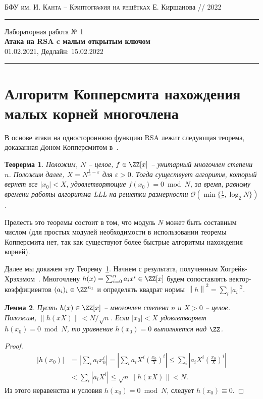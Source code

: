 \documentclass[11pt]{exam}
\newtheorem{theorem}{Теорерма}
\newtheorem{lemma}[theorem]{Лемма}
\theoremstyle{definition}
\newcommand{\bigO}{\mathcal{O}}
\newcommand*\abs[1]{\left\lvert#1\right\rvert}
\newcommand*\norm[1]{\left\lVert#1\right\rVert}
\begin{document}
	{\noindent
		\textsc{БФУ им. И. Канта -- Криптография на решётках}
		\hfill {Е. Киршанова // 2022\\}
\hrule
\begin{center}
	{\LARGE
			Лабораторная работа № 1 \\[5pt]
			\textbf{Атака на RSA c малым открытым ключом } \\[10pt]
	 	{01.02.2021, Дедлайн: 15.02.2022} 
 	} 
\end{center}
\hrule \vspace{5mm}
	
	\thispagestyle{empty}
	
	\vspace{0.2cm}
	\section{Алгоритм Копперсмита нахождения малых корней многочлена}
	
	В основе атаки на одностороннюю функцию RSA лежит следующая теорема, доказанная Доном Копперсмитом в~\cite{Coppersmith}.
	
	\begin{theorem}\label{thm:Coppersmith}
		Положим, $N$ -- целое, $f\in \ZZ[x]$ -- унитарный многочлен степени $n$. Положим далее, $X = N^{\frac{1}{n}-\varepsilon}$ для $\varepsilon>0$. Тогда существует алгоритм, который вернет все $|x_0| < X$, удовлетворяющие $f(x_0) =0 \bmod N$, за время, равному времени работы алгоритма LLL на решетки размерности $\bigO(\min\{ \frac{1}{\varepsilon}, \log_2 N \})$.
	\end{theorem}

	Прелесть это теоремы состоит в том, что модуль $N$ может быть составным числом (для простых модулей необходимости в использовании теоремы Копперсмита нет, так как существуют более быстрые алгоритмы нахождения корней).
	
	Далее мы докажем эту Теорему~\ref{thm:Coppersmith}. Начнем с результата, полученным Хогрейв-Хрэхэмом~\cite{HG}. Многочлену $h(x) = \sum_{i=0}^{n} a_i x^i \in \ZZ[x]$ будем сопоставлять вектор-коэффициентов $(a_i)_i\in \ZZ^{n_1}$ и определять квадрат нормы $\norm{h}^2 = \sum_i \abs{a_i}^2$. 
	\begin{lemma}\label{lem:HG}
		Пусть $h(x) \in \ZZ[x]$ -- многочлен степени $n$ и $X>0$ -- целое. Положим, $\norm{h(xX)} < N / \sqrt{n}$. Если $\abs{x_0} < X$ удовлетворяет $h(x_0) = 0 \bmod N$, то уравнение $h(x_0) = 0$ выполняется над $\ZZ$.
	\end{lemma}
	\begin{proof}
	\begin{align*}
		\abs{h(x_0)} &=\abs{\sum_i a_i x^i_0} = \abs{ \sum_i a_i X^i \left( \frac{x_0}{X} \right)^i} \leq \sum_i \abs{a_i X^i \left( \frac{x_0}{X} \right)^i} \\
		& < \sum_i \abs{a_i X^i} \leq \sqrt{n} \norm{h(xX)} < N. 
	\end{align*}
	Из этого неравенства и условия $h(x_0) = 0 \bmod N$, следует $h(x_0) \equiv 0$. 
	\end{proof}

}
\end{document}
